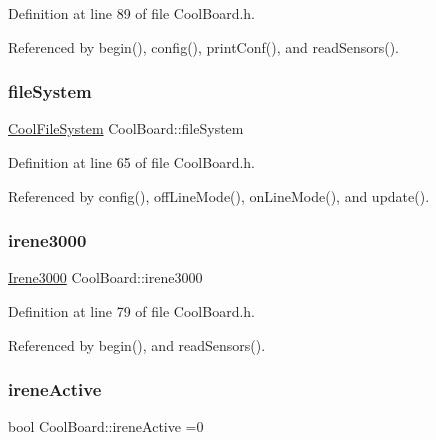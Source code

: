 Definition at line 89 of file Cool\+Board.\+h.



Referenced by begin(), config(), print\+Conf(), and read\+Sensors().

\mbox{\label{classCoolBoard_a42c2586fbb13ff7f06538e9284e8538d}} 
\subsubsection{\texorpdfstring{file\+System}{fileSystem}}
{\footnotesize\ttfamily \hyperlink{classCoolFileSystem}{Cool\+File\+System} Cool\+Board\+::file\+System\hspace{0.3cm}{\ttfamily [private]}}



Definition at line 65 of file Cool\+Board.\+h.



Referenced by config(), off\+Line\+Mode(), on\+Line\+Mode(), and update().

\mbox{\label{classCoolBoard_ad103718ce316006c4695b8eb312eaf11}} 
\subsubsection{\texorpdfstring{irene3000}{irene3000}}
{\footnotesize\ttfamily \hyperlink{classIrene3000}{Irene3000} Cool\+Board\+::irene3000\hspace{0.3cm}{\ttfamily [private]}}



Definition at line 79 of file Cool\+Board.\+h.



Referenced by begin(), and read\+Sensors().

\mbox{\label{classCoolBoard_a9c3f7ac625481ee2ae802a25d97a4ae0}} 
\subsubsection{\texorpdfstring{irene\+Active}{ireneActive}}
{\footnotesize\ttfamily bool Cool\+Board\+::irene\+Active =0\hspace{0.3cm}{\ttfamily [private]}}



